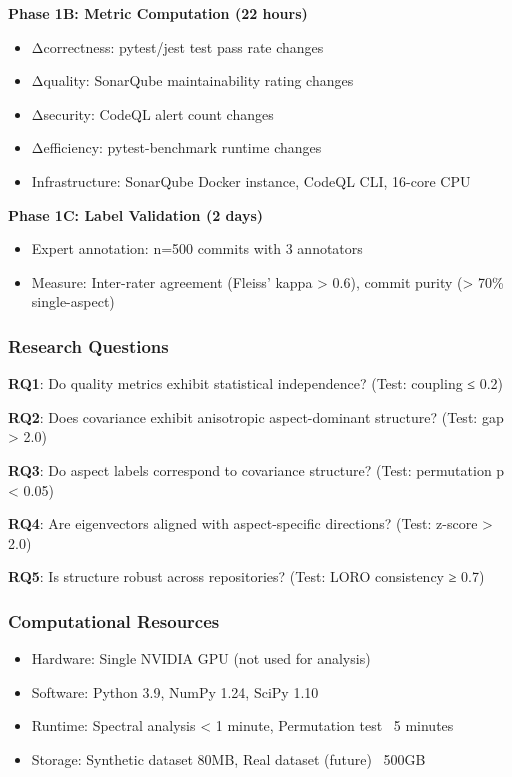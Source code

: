 \textbf{Phase 1B: Metric Computation (22 hours)}
\begin{itemize}
\item Δcorrectness: pytest/jest test pass rate changes
\item Δquality: SonarQube maintainability rating changes
\item Δsecurity: CodeQL alert count changes
\item Δefficiency: pytest-benchmark runtime changes
\item Infrastructure: SonarQube Docker instance, CodeQL CLI, 16-core CPU
\end{itemize}

\textbf{Phase 1C: Label Validation (2 days)}
\begin{itemize}
\item Expert annotation: n=500 commits with 3 annotators
\item Measure: Inter-rater agreement (Fleiss' kappa > 0.6), commit purity (> 70\% single-aspect)
\end{itemize}

\subsubsection{Research Questions}

\textbf{RQ1}: Do quality metrics exhibit statistical independence? (Test: coupling ≤ 0.2)

\textbf{RQ2}: Does covariance exhibit anisotropic aspect-dominant structure? (Test: gap > 2.0)

\textbf{RQ3}: Do aspect labels correspond to covariance structure? (Test: permutation p < 0.05)

\textbf{RQ4}: Are eigenvectors aligned with aspect-specific directions? (Test: z-score > 2.0)

\textbf{RQ5}: Is structure robust across repositories? (Test: LORO consistency ≥ 0.7)

\subsubsection{Computational Resources}

\begin{itemize}
\item Hardware: Single NVIDIA GPU (not used for analysis)
\item Software: Python 3.9, NumPy 1.24, SciPy 1.10
\item Runtime: Spectral analysis < 1 minute, Permutation test ~5 minutes
\item Storage: Synthetic dataset 80MB, Real dataset (future) ~500GB
\end{itemize}
